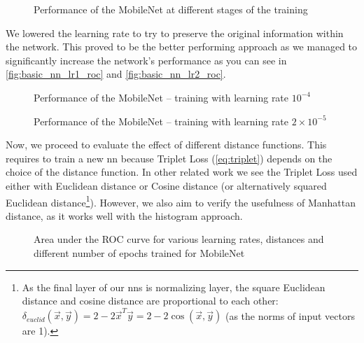 \begin{figure}
    \centering
    \def\svgwidth{\columnwidth}
    
    \caption{Performance of the MobileNet at different stages of the training}
    \label{fig:basic_nn_overfit_roc}
\end{figure}

We lowered the learning rate to try to preserve the original information within the network. This proved to be the better performing approach as we managed to significantly increase the network's performance as you can see in \autoref{fig:basic_nn_lr1_roc} and \autoref{fig:basic_nn_lr2_roc}.

\begin{figure}
    \centering
    \def\svgwidth{\columnwidth}
    
    \caption{Performance of the MobileNet -- training with learning rate $10^{-4}$}
    \label{fig:basic_nn_lr1_roc}
\end{figure}

\begin{figure}
    \centering
    \def\svgwidth{\columnwidth}
    
    \caption{Performance of the MobileNet -- training with learning rate $2 \times 10^{-5}$}
    \label{fig:basic_nn_lr2_roc}
\end{figure}

Now, we proceed to evaluate the effect of different distance functions. This requires to train a new \gls{nn} because Triplet Loss (\autoref{eq:triplet}) depends on the choice of the distance function. In other related work we see the Triplet Loss used either with Euclidean distance or Cosine distance (or alternatively squared Euclidean distance\footnote{As the final layer of our \glspl{nn} is normalizing layer, the square Euclidean distance and cosine distance are proportional to each other: $\delta_{euclid}(\vec{x}, \vec{y}) = 2 - 2\vec{x}^T\vec{y} = 2 - 2 \cos(\vec{x}, \vec{y})$ (as the norms of input vectors are 1).}). However, we also aim to verify the usefulness of Manhattan distance, as it works well with the histogram approach.

\begin{figure}
    \centering
    \large
    
    \def\svgwidth{\columnwidth}
    \scalebox{0.75}{}
    \vspace{1cm}

    
    \def\svgwidth{\columnwidth}
    \scalebox{0.75}{}
    \vspace{1cm}
    
    \def\svgwidth{\columnwidth}
    \scalebox{0.75}{
    }
    \caption{Area under the ROC curve for various learning rates, distances and different number of epochs trained for MobileNet}
    \label{fig:lr_heatmap}
\end{figure}

